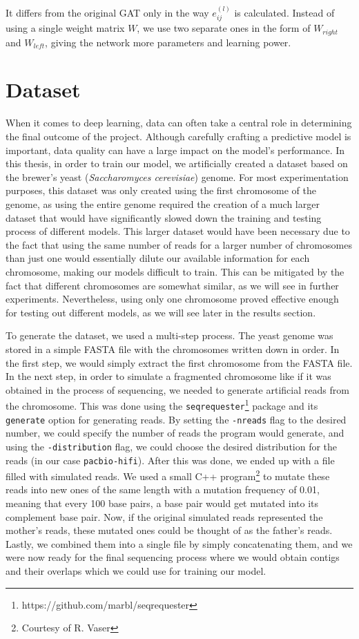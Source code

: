 \documentclass[times, utf8, diplomski, english]{fer_eng}
\begin{document}
It differs from the original GAT only in the way $e_{ij}^{(l)}$ is calculated. Instead of using a single weight matrix $W$, we use two separate ones in the form of $W_{right}$ and $W_{left}$, giving the network more parameters and learning power.

\chapter{Dataset}
\label{dataset}

When it comes to deep learning, data can often take a central role in determining the final outcome of the project. Although carefully crafting a predictive model is important, data quality can have a large impact on the model's performance. In this thesis, in order to train our model, we artificially created a dataset based on the brewer's yeast (\textit{Saccharomyces cerevisiae}) genome. For most experimentation purposes, this dataset was only created using the first chromosome of the genome, as using the entire genome required the creation of a much larger dataset that would have significantly slowed down the training and testing process of different models. This larger dataset would have been necessary due to the fact that using the same number of reads for a larger number of chromosomes than just one would essentially dilute our available information for each chromosome, making our models difficult to train. This can be mitigated by the fact that different chromosomes are somewhat similar, as we will see in further experiments. Nevertheless, using only one chromosome proved effective enough for testing out different models, as we will see later in the results section.

To generate the dataset, we used a multi-step process. The yeast genome was stored in a simple FASTA file with the chromosomes written down in order. In the first step, we would simply extract the first chromosome from the FASTA file. In the next step, in order to simulate a fragmented chromosome like if it was obtained in the process of sequencing, we needed to generate artificial reads from the chromosome. This was done using the \texttt{seqrequester}\footnote{https://github.com/marbl/seqrequester} package and its \texttt{generate} option for generating reads. By setting the \texttt{-nreads} flag to the desired number, we could specify the number of reads the program would generate, and using the \texttt{-distribution} flag, we could choose the desired distribution for the reads (in our case \texttt{pacbio-hifi}). After this was done, we ended up with a file filled with simulated reads. We used a small C++ program\footnote{Courtesy of R. Vaser} to mutate these reads into new ones of the same length with a mutation frequency of 0.01, meaning that every 100 base pairs, a base pair would get mutated into its complement base pair. Now, if the original simulated reads represented the mother's reads, these mutated ones could be thought of as the father's reads. Lastly, we combined them into a single file by simply concatenating them, and we were now ready for the final sequencing process where we would obtain contigs and their overlaps which we could use for training our model.
\end{document}
